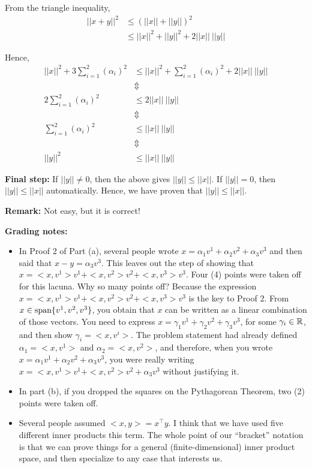 \documentclass[letterpaper]{article}
\begin{document}
\begin{enumerate}
 From the triangle inequality,
 \begin{align*}
 ||x + y||^2 &\le (||x|| + ||y||)^2\\
  &\le ||x||^2 + ||y||^2 + 2 ||x||~||y||
 \end{align*}

 Hence,
  \begin{align*}
  ||x||^2 +  3 \sum_{i=1}^2 (\alpha_i)^2 &\le ||x||^2 + \sum_{i=1}^2 (\alpha_i)^2 + 2 ||x||~||y||\\
  &\Updownarrow \\
  2 \sum_{i=1}^2 (\alpha_i)^2 &\le 2 ||x||~||y||\\
    &\Updownarrow \\
  \sum_{i=1}^2 (\alpha_i)^2 &\le  ||x||~||y|| \\
      &\Updownarrow \\
  ||y||^2 &\le  ||x||~||y||
  \end{align*}

 \textbf{Final step:} If $||y|| \ne 0$, then the above gives $||y|| \le ||x||$. If $||y|| = 0$, then $||y|| \le ||x||$ automatically. Hence, we have proven that $||y|| \le ||x||$.

\textbf{Remark:} Not easy, but it is correct!

\newpage

\textbf{Grading notes:}
\begin{itemize}
\item In Proof 2 of Part (a), several people wrote $x=\alpha_1 v^1 + \alpha_2 v^2 + \alpha_3 v^3$ and then said that $x-y = \alpha_3 v^3$. This leaves out the step of showing that  $x=<x,v^1> v^1 + <x,v^2> v^2 + <x,v^3> v^3$. Four (4) points were taken off for this lacuna. Why so many points off? Because the expression $x=<x,v^1> v^1 + <x,v^2> v^2 + <x,v^3> v^3$ is the key to Proof 2. From $x\in \textrm{span} \{ v^1, v^2, v^3 \}$, you obtain that $x$ can be written as a linear combination of those vectors. You need to express $x=\gamma_1 v^1 + \gamma_2 v^2 + \gamma_3 v^3$, for some $\gamma_i \in \mathbb R$, and then show $\gamma_i = <x, v^i>$. The problem statement had already defined $\alpha_1=<x,v^1>$ and $\alpha_2=<x,v^2>$, and therefore, when you wrote $x=\alpha_1 v^1 + \alpha_2 v^2 + \alpha_3 v^3$, you were really writing $x=<x,v^1> v^1 + <x,v^2>v^2 + \alpha_3 v^3$ without justifying it.

    \item In part (b), if you dropped the squares on the Pythagorean Theorem, two (2) points were taken off.
    
    \item Several people assumed $<x,y> = x^\top y$. I think that we have used five different inner products this term. The whole point of our ``bracket'' notation is that we can prove things for a general (finite-dimensional) inner product space, and then specialize to any case that interests us.

\end{itemize}

\end{enumerate}
\end{document}
